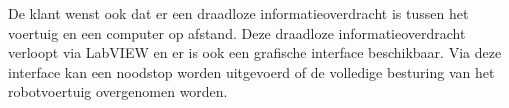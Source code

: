 \documentclass[a4paper,kulak]{kulakarticle} %
\begin{document}
De klant wenst ook dat er een draadloze informatieoverdracht is tussen het voertuig en een computer op afstand. Deze draadloze informatieoverdracht verloopt via LabVIEW en er is ook een grafische interface beschikbaar. Via deze interface kan een noodstop worden uitgevoerd of de volledige besturing van het robotvoertuig overgenomen worden.



\end{document}
